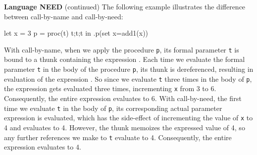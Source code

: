 \begin{minipage}[t]{\sw}
\slidenumber
\LARGE
{\bf Language NEED} (continued)\exx
The following example illustrates the difference
between call-by-name and call-by-need:
\begin{qv}
let
  x = 3
  p = proc(t) {t;t;t}
in
  .p(set x=add1(x))
\end{qv}
\LARGE
With call-by-name,
when we apply the procedure \verb'p',
its formal parameter \verb't' is bound to a thunk
containing the expression .
Each time we evaluate the formal parameter \verb't'
in the body of the procedure \verb'p',
its thunk is dereferenced, resulting
in evaluation of the expression .
So since we evaluate \verb't' three times in the body of \verb'p',
the expression 
gets evaluated three times, incrementing \verb'x' from 3 to 6.
Consequently, the entire expression evaluates to 6.\exx
With call-by-need,
the first time we evaluate \verb't' in the body of \verb'p',
its corresponding actual parameter expression
is evaluated,
which has the side-effect of incrementing the value of \verb'x' to 4
and evaluates to 4.
However, the thunk memoizes the expressed value of 4,
so any further references we make to \verb't' evaluate to 4.
Consequently, the entire expression evaluates to 4.
\end{minipage}
\clearpage
